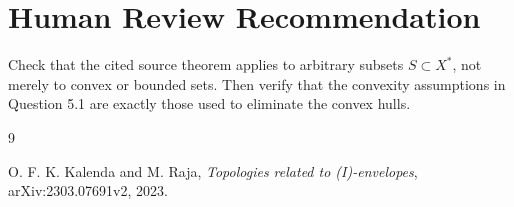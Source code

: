 \documentclass[11pt]{article}
\begin{document}
\section*{Human Review Recommendation}

Check that the cited source theorem applies to arbitrary subsets
$S\subset X^*$, not merely to convex or bounded sets. Then verify that the
convexity assumptions in Question 5.1 are exactly those used to eliminate the
convex hulls.

\begin{thebibliography}{9}

O. F. K. Kalenda and M. Raja,
\emph{Topologies related to (I)-envelopes},
arXiv:2303.07691v2, 2023.

\end{thebibliography}
\end{document}
